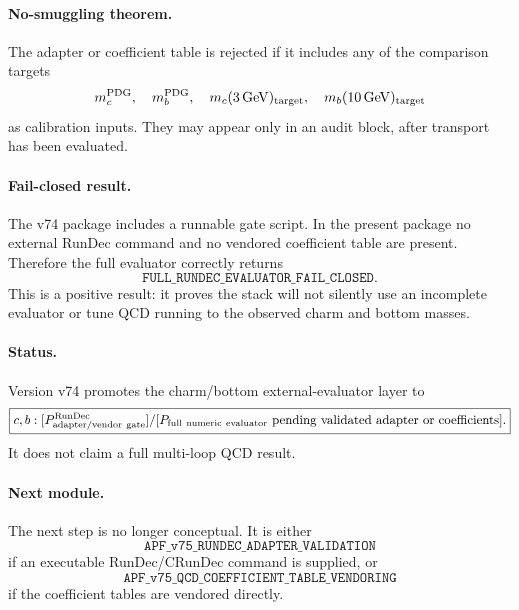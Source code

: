 \paragraph{No-smuggling theorem.}
The adapter or coefficient table is rejected if it includes any of the comparison targets
\[
 m_c^{\rm PDG},\quad m_b^{\rm PDG},\quad
 m_c(3\,{\rm GeV})_{\rm target},\quad m_b(10\,{\rm GeV})_{\rm target}
\]
as calibration inputs.  They may appear only in an audit block, after transport has been evaluated.

\paragraph{Fail-closed result.}
The v74 package includes a runnable gate script.  In the present package no external RunDec command and no vendored coefficient table are present.  Therefore the full evaluator correctly returns
\[
 \boxed{\texttt{FULL\_RUNDEC\_EVALUATOR\_FAIL\_CLOSED}.}
\]
This is a positive result: it proves the stack will not silently use an incomplete evaluator or tune QCD running to the observed charm and bottom masses.

\paragraph{Status.}
Version v74 promotes the charm/bottom external-evaluator layer to
\[
 \boxed{
 c,b:
 [P_{\rm adapter/vendor\ gate}^{\rm RunDec}]
 /
 [P_{\rm full\ numeric\ evaluator}\ {\rm pending\ validated\ adapter\ or\ coefficients}].
 }
\]
It does not claim a full multi-loop QCD result.

\paragraph{Next module.}
The next step is no longer conceptual.  It is either
\[
 \boxed{\texttt{APF\_v75\_RUNDEC\_ADAPTER\_VALIDATION}}
\]
if an executable RunDec/CRunDec command is supplied, or
\[
 \boxed{\texttt{APF\_v75\_QCD\_COEFFICIENT\_TABLE\_VENDORING}}
\]
if the coefficient tables are vendored directly.
